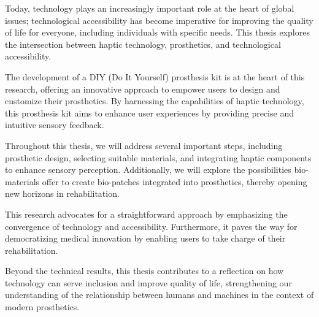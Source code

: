 Today, technology plays an increasingly important role at the heart of global issues; technological accessibility has become imperative for improving the quality of life for everyone, including individuals with specific needs. This thesis explores the intersection between haptic technology, prosthetics, and technological accessibility. 

The development of a DIY (Do It Yourself) prosthesis kit is at the heart of this research, offering an innovative approach to empower users to design and customize their prosthetics. By harnessing the capabilities of haptic technology, this prosthesis kit aims to enhance user experiences by providing precise and intuitive sensory feedback. 

Throughout this thesis, we will address several important steps, including prosthetic design, selecting suitable materials, and integrating haptic components to enhance sensory perception. Additionally, we will explore the possibilities bio-materials offer to create bio-patches integrated into prosthetics, thereby opening new horizons in rehabilitation.

This research advocates for a straightforward approach by emphasizing the convergence of technology and accessibility. Furthermore, it paves the way for democratizing medical innovation by enabling users to take charge of their rehabilitation.

Beyond the technical results, this thesis contributes to a reflection on how technology can serve inclusion and improve quality of life, strengthening our understanding of the relationship between humans and machines in the context of modern prosthetics.
